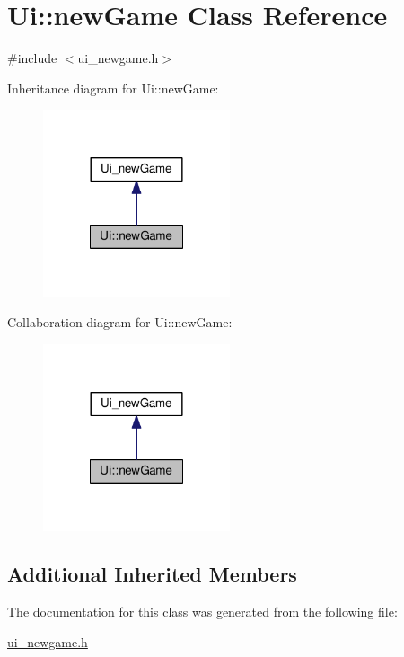\hypertarget{classUi_1_1newGame}{\section{Ui\-:\-:new\-Game Class Reference}
\label{classUi_1_1newGame}
}


{\ttfamily \#include $<$ui\-\_\-newgame.\-h$>$}



Inheritance diagram for Ui\-:\-:new\-Game\-:\nopagebreak
\begin{figure}[H]
\begin{center}
\leavevmode
\includegraphics[width=156pt]{classUi_1_1newGame__inherit__graph}
\end{center}
\end{figure}


Collaboration diagram for Ui\-:\-:new\-Game\-:\nopagebreak
\begin{figure}[H]
\begin{center}
\leavevmode
\includegraphics[width=156pt]{classUi_1_1newGame__coll__graph}
\end{center}
\end{figure}
\subsection*{Additional Inherited Members}


The documentation for this class was generated from the following file\-:\begin{DoxyCompactItemize}
\item 
\hyperlink{ui__newgame_8h}{ui\-\_\-newgame.\-h}\end{DoxyCompactItemize}
